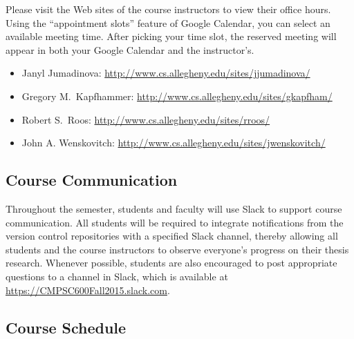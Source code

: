 Please visit the Web sites of the course instructors to view their office hours.  Using the ``appointment slots''
feature of Google Calendar, you can select an available meeting time. After picking your time slot, the reserved meeting
will appear in both your Google Calendar and the instructor's.

\vspace*{-.1in}
\begin{itemize}
    \itemsep -.25em
        \item Janyl Jumadinova: \url{http://www.cs.allegheny.edu/sites/jjumadinova/}
        \item Gregory M.\ Kapfhammer: \url{http://www.cs.allegheny.edu/sites/gkapfham/}
        \item Robert S.\ Roos: \url{http://www.cs.allegheny.edu/sites/rroos/}
        \item John A. Wenskovitch: \url{http://www.cs.allegheny.edu/sites/jwenskovitch/}
\end{itemize}

\vspace*{-.25in}
\subsection*{Course Communication}

Throughout the semester, students and faculty will use Slack to support course communication. All students will be
required to integrate notifications from the version control repositories with a specified Slack channel, thereby
allowing all students and the course instructors to observe everyone's progress on their thesis research.  Whenever
possible, students are also encouraged to post appropriate questions to a channel in Slack, which is available at
\url{https://CMPSC600Fall2015.slack.com}.

\vspace*{-.1in}
\subsection*{Course Schedule}

